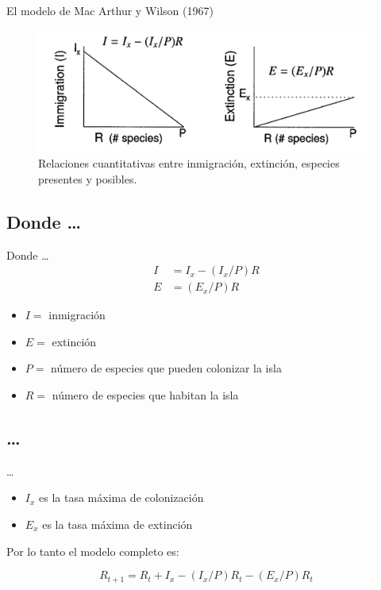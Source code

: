 \documentclass[
  11pt,
  ignorenonframetext,
]{beamer}
\begin{document}
\begin{frame}{El modelo de Mac Arthur y Wilson (1967)}
\begin{figure}

{\centering \includegraphics{Biogeografia/MacArthur} 

}

\caption{Relaciones cuantitativas entre inmigración, extinción, especies presentes y posibles.}\label{fig:unnamed-chunk-2}
\end{figure}
\end{frame}

\hypertarget{donde}{%
\subsection{Donde \ldots{}}\label{donde}}

\begin{frame}{Donde \ldots{}}
\begin{align}
I &= I_x - (I_x/P)R \\
E &= (E_x/P)R
\end{align}

\begin{itemize}
\item
  \(I =\) inmigración
\item
  \(E =\) extinción
\item
  \(P =\) número de especies que pueden colonizar la isla
\item
  \(R =\) número de especies que habitan la isla
\end{itemize}
\end{frame}

\hypertarget{section}{%
\subsection{\ldots{}}\label{section}}

\begin{frame}{\ldots{}}
\begin{itemize}
\item
  \(I_x\) es la tasa máxima de colonización
\item
  \(E_x\) es la tasa máxima de extinción
\end{itemize}

Por lo tanto el modelo completo es:

\[R_{t+1} = R_t + I_x - (I_x/P)R_t - (E_x/P)R_t\]
\end{frame}
\end{document}
